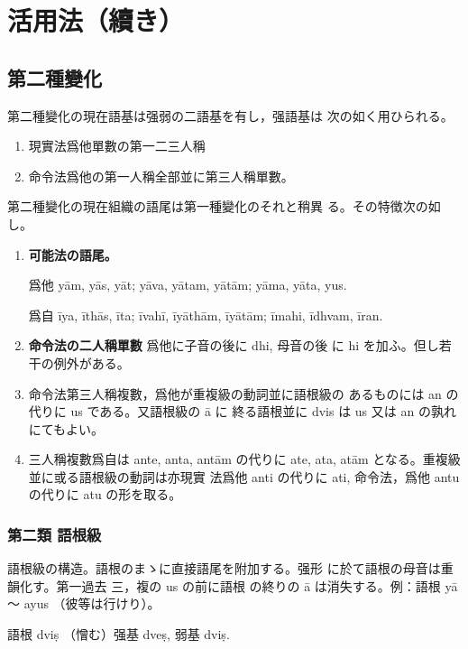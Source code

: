 \section{活用法（續き）}
\subsection{第二種變化}
\numberParagraph \label{np:136}
第二種變化の現在語基は强弱の二語基を有し，强語基は
次の如く用ひられる。
\begin{enumerate}[label=(\alph*)]
\item 現實法爲他單數の第一二三人稱
\item 命令法爲他の第一人稱全部並に第三人稱單數。
\end{enumerate}

\numberParagraph
第二種變化の現在組織の語尾は第一種變化のそれと稍異
る。その特徴次の如し。
\begin{enumerate}[label=(\alph*)]
\item \textbf{可能法の語尾。}

爲他 yām, yās, yāt; yāva, yātam, yātām; yāma,
yāta, yus.

爲自 īya, īthās, īta; īvahī, īyāthām, īyātām; īmahi,
īdhvam, īran.
\item \textbf{命令法の二人稱單數} 爲他に子音の後に dhi, 母音の後
に hi を加ふ。但し若干の例外がある。
\item 命令法第三人稱複數，爲他が重複級の動詞並に語根級の
あるものには an の代りに us である。又語根級の ā に
終る語根並に dvis は us 又は an の孰れにてもよい。
\item 三人稱複數爲自は ante, anta, antām の代りに ate,
ata, atām となる。重複級並に或る語根級の動詞は亦現實
法爲他 anti の代りに ati, 命令法，爲他 antu の代りに
atu の形を取る。
\end{enumerate}

\subsubsection{第二類 語根級}
\numberParagraph \label{np:138}
語根級の構造。語根のまゝに直接語尾を附加する。强形
に於て語根の母音は重韻化す。第一過去 三，複の us の前に語根
の終りの ā は消失する。例：語根 yā ～ ayus （彼等は行けり）。

\numberParagraph
語根 dviṣ （憎む）强基 dveṣ, 弱基 dviṣ.

